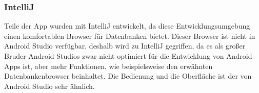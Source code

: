 \documentclass[FIPLY_base.tex]{subfiles}
\begin{document}
\subsubsection{IntelliJ}
Teile der App wurden mit IntelliJ entwickelt, da diese Entwicklungsumgebung einen komfortablen Browser für Datenbanken bietet.
Dieser Browser ist nicht in Android Studio verfügbar, deshalb wird zu IntelliJ gegriffen, da es als großer Bruder Android Studios zwar nicht optimiert für die Entwicklung von Android Apps ist, aber mehr Funktionen, wie beispielsweise den erwähnten Datenbankenbrowser beinhaltet.
Die Bedienung und die Oberfläche ist der von Android Studio sehr ähnlich. 
\end{document}
